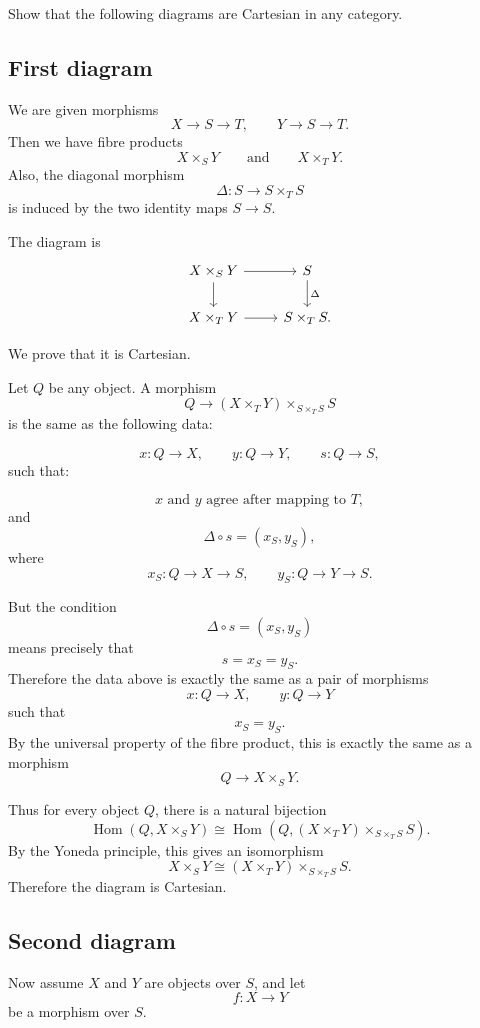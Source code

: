 \documentclass[12pt,a4paper]{article}
\theoremstyle{notespace}
\begin{document}
Show that the following diagrams are Cartesian in any category.

\subsection{First diagram}

We are given morphisms
\[
X\longrightarrow S\longrightarrow T,
\qquad
Y\longrightarrow S\longrightarrow T.
\]
Then we have fibre products
\[
X\times_S Y
\qquad\text{and}\qquad
X\times_T Y.
\]
Also, the diagonal morphism
\[
\Delta:S\longrightarrow S\times_T S
\]
is induced by the two identity maps \(S\to S\).

The diagram is
\[
\begin{tikzcd}
	X\times_S Y \arrow[r] \arrow[d]
	&
	S \arrow[d,"\Delta"]
	\\
	X\times_T Y \arrow[r]
	&
	S\times_T S.
\end{tikzcd}
\]

We prove that it is Cartesian.

Let \(Q\) be any object. A morphism
\[
Q\longrightarrow
(X\times_T Y)\times_{S\times_T S}S
\]
is the same as the following data:

\[
x:Q\to X,
\qquad
y:Q\to Y,
\qquad
s:Q\to S,
\]
such that:

\[
x \text{ and } y \text{ agree after mapping to } T,
\]
and
\[
\Delta\circ s
=
(x_S,y_S),
\]
where
\[
x_S:Q\to X\to S,
\qquad
y_S:Q\to Y\to S.
\]

But the condition
\[
\Delta\circ s=(x_S,y_S)
\]
means precisely that
\[
s=x_S=y_S.
\]
Therefore the data above is exactly the same as a pair of morphisms
\[
x:Q\to X,
\qquad
y:Q\to Y
\]
such that
\[
x_S=y_S.
\]
By the universal property of the fibre product, this is exactly the same
as a morphism
\[
Q\longrightarrow X\times_S Y.
\]

Thus for every object \(Q\), there is a natural bijection
\[
\operatorname{Hom}
\left(Q,X\times_S Y\right)
\cong
\operatorname{Hom}
\left(
Q,(X\times_T Y)\times_{S\times_T S}S
\right).
\]
By the Yoneda principle, this gives an isomorphism
\[
X\times_S Y
\cong
(X\times_T Y)\times_{S\times_T S}S.
\]
Therefore the diagram is Cartesian.

\subsection{Second diagram}

Now assume \(X\) and \(Y\) are objects over \(S\), and let
\[
f:X\longrightarrow Y
\]
be a morphism over \(S\).
\end{document}
